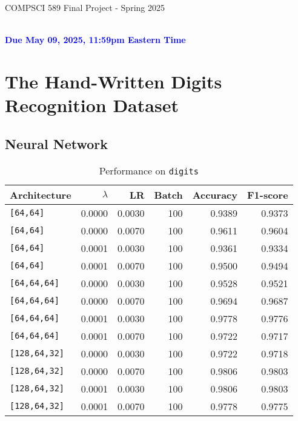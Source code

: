 \documentclass[letterpaper]{article}
\newcommand{\HIGHLIGHT}[1]{\textcolor{blue}{\textbf{#1}}}
\begin{document}
\newpage
\begin{center}
    \begin{Large}
    COMPSCI 589 Final Project - Spring 2025
    \end{Large}
    \\
    \HIGHLIGHT{Due May 09, 2025, 11:59pm Eastern Time}
\end{center}



\vspace{0.25in}
\section{The Hand-Written Digits Recognition Dataset}
\subsection{Neural Network}
\begin{table}[H]
  \centering
  \caption{Performance on \texttt{digits}}
  \begin{tabular}{l r r r r r}
    \toprule
    Architecture      & $\lambda$ & LR     & Batch & Accuracy & F1-score \\
    \midrule
    \texttt{[64,64]}     & 0.0000    & 0.0030 & 100   & 0.9389   & 0.9373   \\
    \texttt{[64,64]}     & 0.0000    & 0.0070 & 100   & 0.9611   & 0.9604   \\
    \texttt{[64,64]}     & 0.0001    & 0.0030 & 100   & 0.9361   & 0.9334   \\
    \texttt{[64,64]}     & 0.0001    & 0.0070 & 100   & 0.9500   & 0.9494   \\
    \addlinespace
    \texttt{[64,64,64]}   & 0.0000    & 0.0030 & 100   & 0.9528   & 0.9521   \\
    \texttt{[64,64,64]}   & 0.0000    & 0.0070 & 100   & 0.9694   & 0.9687   \\
    \texttt{[64,64,64]}   & 0.0001    & 0.0030 & 100   & 0.9778   & 0.9776   \\
    \texttt{[64,64,64]}   & 0.0001    & 0.0070 & 100   & 0.9722   & 0.9717   \\
    \addlinespace
    \texttt{[128,64,32]}  & 0.0000    & 0.0030 & 100   & 0.9722   & 0.9718   \\
    \texttt{[128,64,32]}  & 0.0000    & 0.0070 & 100   & 0.9806   & 0.9803   \\
    \texttt{[128,64,32]}  & 0.0001    & 0.0030 & 100   & 0.9806   & 0.9803   \\
    \texttt{[128,64,32]}  & 0.0001    & 0.0070 & 100   & 0.9778   & 0.9775   \\
    \bottomrule
  \end{tabular}
\end{table}
\end{document}
